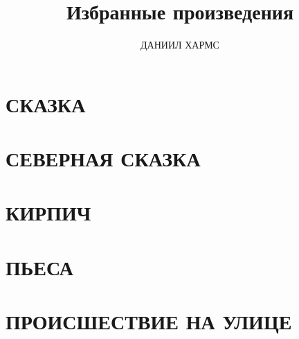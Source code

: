 \documentclass[12pt]{article}
\title{Избранные произведения}
\author{ДАНИИЛ ХАРМС}
\date{}
\begin{document}
\setlength{\parindent}{1.5cm}
\maketitle
\vspace*{-\baselineskip}



\chapter{СКАЗКА}


\chapter{СЕВЕРНАЯ СКАЗКА}






\chapter{КИРПИЧ}


\chapter{ПЬЕСА}


\chapter{ПРОИСШЕСТВИЕ НА УЛИЦЕ}

\end{document}
